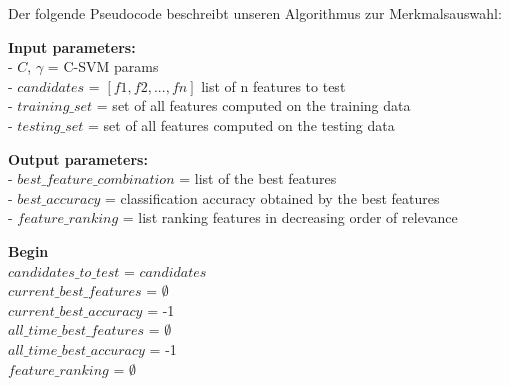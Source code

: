 Der folgende Pseudocode beschreibt unseren Algorithmus zur Merkmalsauswahl: \\

\begin{algorithm}[H]
    

    
    \textbf{Input parameters:}  \\
    \hspace{0.5cm} - $C$, $\gamma$ = C-SVM params \\
    \hspace{0.5cm} - $candidates$ = $[f1,f2,...,fn]$ list of n features to test \\
    \hspace{0.5cm} - $training\_set$ = set of all features computed on the training data \\
    \hspace{0.5cm} - $testing\_set$ = set of all features computed on the testing data 
    
    \textbf{Output parameters:} \\
    \hspace{0.5cm} - $best\_feature\_combination$ = list of the best features \\
    \hspace{0.5cm} - $best\_accuracy$ = classification accuracy obtained by the best features \\
    \hspace{0.5cm} - $feature\_ranking$ = list ranking features in decreasing order of relevance
    
    \hrulefill 
    
    \textbf{Begin} \\
    $candidates\_to\_test$ = $candidates$ \\
    $current\_best\_features$ = $\emptyset$ \\
    $current\_best\_accuracy$ = -1 \\
    $all\_time\_best\_features$ = $\emptyset$ \\ 
    $all\_time\_best\_accuracy$ = -1 \\
    $feature\_ranking$ = $\emptyset$ 


\end{algorithm}
